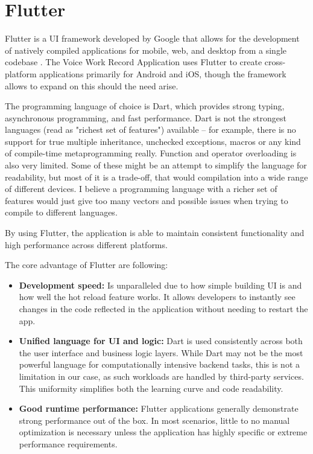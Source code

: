 \documentclass[
  digital,     %
  oneside,     %
  nosansbold,  %
  nocolorbold, %
  lof,         %
  lot,         %
]{fithesis4}
\begin{document}
\section{Flutter}

Flutter is a UI framework developed by Google that allows for the development of natively compiled applications for mobile, web, and desktop from a single codebase \cite{flutterGithub}. The Voice Work Record Application uses Flutter to create cross-platform applications primarily for Android and iOS, though the framework allows to expand on this should the need arise.

The programming language of choice is Dart, which provides strong typing, asynchronous programming, and fast performance. Dart is not the strongest languages (read as "richest set of features") available – for example, there is no support for true multiple inheritance, unchecked exceptions, macros or any kind of compile-time metaprogramming really. Function and operator overloading is also very limited. Some of these might be an attempt to simplify the language for readability, but most of it is a trade-off, that would compilation into a wide range of different devices. I believe a programming language with a richer set of features would just give too many vectors and possible issues when trying to compile to different languages.

By using Flutter, the application is able to maintain consistent functionality and high performance across different platforms.

The core advantage of Flutter are following:
\begin{itemize}
    \item \textbf{Development speed:} Is unparalleled due to how simple building UI is and how well the hot reload feature works. It allows developers to instantly see changes in the code reflected in the application without needing to restart the app.
    \item \textbf{Unified language for UI and logic:} Dart is used consistently across both the user interface and business logic layers. While Dart may not be the most powerful language for computationally intensive backend tasks, this is not a limitation in our case, as such workloads are handled by third-party services. This uniformity simplifies both the learning curve and code readability.
    \item \textbf{Good runtime performance:} Flutter applications generally demonstrate strong performance out of the box. In most scenarios, little to no manual optimization is necessary unless the application has highly specific or extreme performance requirements.
\end{itemize}
\end{document}
